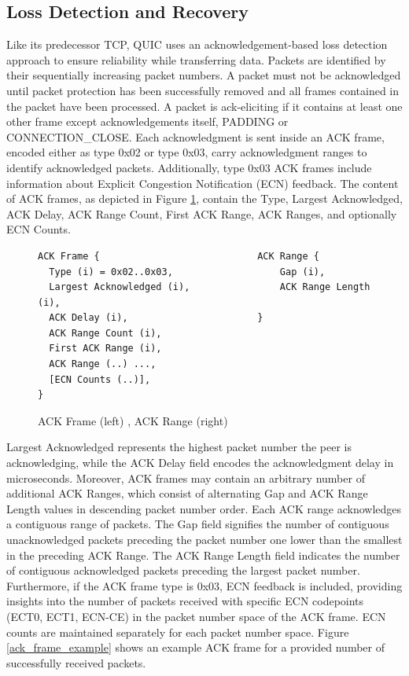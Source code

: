\subsection{Loss Detection and Recovery} \label{loss_detection_recovery}

Like its predecessor TCP, QUIC uses an acknowledgement-based loss detection approach to ensure reliability while transferring data. Packets are identified by their sequentially increasing packet numbers. A packet must not be acknowledged until packet protection has been successfully removed and all frames contained in the packet have been processed. A packet is ack-eliciting if it contains at least one other frame except acknowledgements itself, PADDING or CONNECTION\_CLOSE. Each acknowledgment is sent inside an ACK frame, encoded either as type 0x02 or type 0x03, carry acknowledgment ranges to identify acknowledged packets. Additionally, type 0x03 ACK frames include information about Explicit Congestion Notification (ECN) feedback. The content of ACK frames, as depicted in Figure \ref{ack_frame}, contain the Type, Largest Acknowledged, ACK Delay, ACK Range Count, First ACK Range, ACK Ranges, and optionally ECN Counts. 

\begin{figure}[htb]
    \centering      
\begin{verbatim}
ACK Frame {                            ACK Range {
  Type (i) = 0x02..0x03,                   Gap (i),
  Largest Acknowledged (i),                ACK Range Length (i),
  ACK Delay (i),                       }
  ACK Range Count (i),        
  First ACK Range (i),        
  ACK Range (..) ...,         
  [ECN Counts (..)],          
}
\end{verbatim}
    \caption{ACK Frame (left) \cite[106]{rfc9000}, ACK Range (right) \cite[107]{rfc9000}}
    \label{ack_frame}
\end{figure}

Largest Acknowledged represents the highest packet number the peer is acknowledging, while the ACK Delay field encodes the acknowledgment delay in microseconds. Moreover, ACK frames may contain an arbitrary number of additional ACK Ranges, which consist of alternating Gap and ACK Range Length values in descending packet number order. Each ACK range acknowledges a contiguous range of packets. The Gap field signifies the number of contiguous unacknowledged packets preceding the packet number one lower than the smallest in the preceding ACK Range. The ACK Range Length field indicates the number of contiguous acknowledged packets preceding the largest packet number. Furthermore, if the ACK frame type is 0x03, ECN feedback is included, providing insights into the number of packets received with specific ECN codepoints (ECT0, ECT1, ECN-CE) in the packet number space of the ACK frame. ECN counts are maintained separately for each packet number space. Figure \ref{ack_frame_example} shows an example ACK frame for a provided number of successfully received packets.

